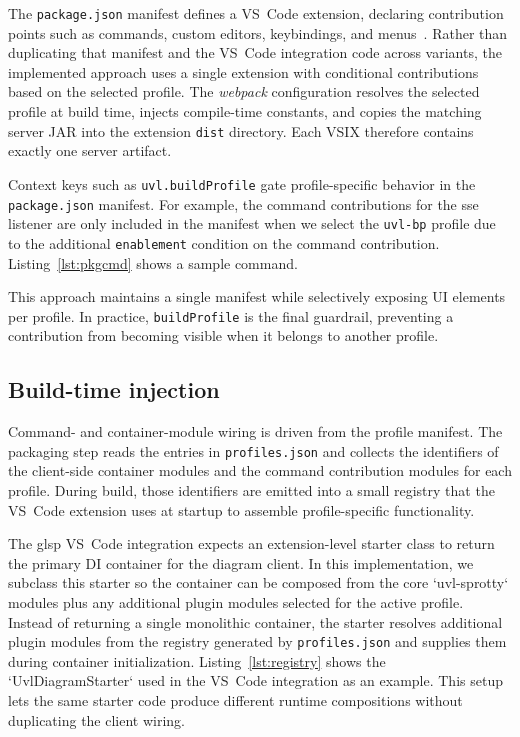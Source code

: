 The \texttt{package.json} manifest defines a VS~Code extension, declaring contribution points such as commands, custom editors, keybindings, and menus~\cite{microsoft_extension_nodate}.
Rather than duplicating that manifest and the VS~Code integration code across variants, the implemented approach uses a single extension with conditional contributions based on the selected profile.
The \textit{webpack} configuration resolves the selected profile at build time, injects compile-time constants, and copies the matching server JAR into the extension \texttt{dist} directory.
Each VSIX therefore contains exactly one server artifact.

Context keys such as \texttt{uvl.buildProfile} gate profile-specific behavior in the \texttt{package.json} manifest.
For example, the command contributions for the \gls{sse} listener are only included in the manifest when we select the \texttt{uvl-bp} profile due to the additional \texttt{enablement} condition on the command contribution.
Listing~\ref{lst:pkgcmd} shows a sample command.

This approach maintains a single manifest while selectively exposing UI elements per profile.
In practice, \texttt{buildProfile} is the final guardrail, preventing a contribution from becoming visible when it belongs to another profile.

\subsection{Build-time injection}
\label{subsec:impl_multi_profile_injection}

Command- and container-module wiring is driven from the profile manifest.
The packaging step reads the entries in \texttt{profiles.json} and collects the identifiers of the client-side container modules and the command contribution modules for each profile.
During build, those identifiers are emitted into a small registry that the VS~Code extension uses at startup to assemble profile-specific functionality.

The \gls{glsp} VS~Code integration expects an extension-level starter class to return the primary DI container for the diagram client.
In this implementation, we subclass this starter so the container can be composed from the core `uvl-sprotty` modules plus any additional plugin modules selected for the active profile.
Instead of returning a single monolithic container, the starter resolves additional plugin modules from the registry generated by \texttt{profiles.json} and supplies them during container initialization.
Listing~\ref{lst:registry} shows the `UvlDiagramStarter` used in the VS~Code integration as an example.
This setup lets the same starter code produce different runtime compositions without duplicating the client wiring.

